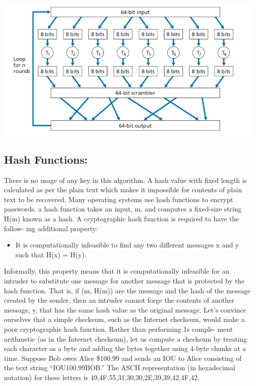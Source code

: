 \documentclass{report}
\theoremstyle{definition}
\begin{document}
{{{\includegraphics[scale=0.5]{newblock}


}
\subsection{Hash Functions:}
\Large{There is no usage of any key in this algorithm. A hash value with fixed length is calculated as per the plain text which makes it impossible for contents of plain text to be recovered. Many operating systems use hash functions to encrypt passwords.
a hash function takes an input, m, and computes a fixed-size
string H(m) known as a hash. A cryptographic hash function is required to have the follow-
ing additional property:
\begin{itemize}
\item{It is computationally infeasible to find any two different messages x and y such
that H(x) = H(y).}
\end{itemize}
Informally, this property means that it is computationally infeasible for an
intruder to substitute one message for another message that is protected by the hash
function. That is, if (m, H(m)) are the message and the hash of the message created
by the sender, then an intruder cannot forge the contents of another message, y, that
has the same hash value as the original message.
Let’s convince ourselves that a simple checksum, such as the Internet checksum,
would make a poor cryptographic hash function. Rather than performing 1s comple-
ment arithmetic (as in the Internet checksum), let us compute a checksum by treating
each character as a byte and adding the bytes together using 4-byte chunks at a time.
Suppose Bob owes Alice \$100.99 and sends an IOU to Alice consisting of the text
string “IOU100.99BOB.” The ASCII representation (in hexadecimal notation) for
these letters is 49,4F,55,31,30,30,2E,39,39,42,4F,42.\newline

}}}
\end{document}
